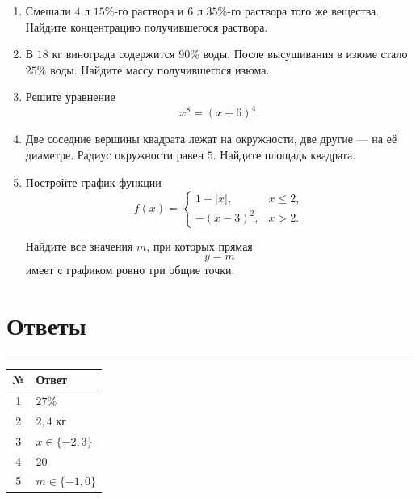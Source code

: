 \documentclass[a4paper,12pt]{article}
\newcommand{\sectionrule}{%
  \par
  \vspace{-0.35em}%
  {\color{accent}\rule{\linewidth}{0.6pt}}%
  \vspace{0.6em}%
}
\begin{document}
\begin{enumerate}

  \item
  Смешали \(4\) л \(15\%\)-го раствора и \(6\) л \(35\%\)-го
  раствора того же вещества.
  Найдите концентрацию получившегося раствора.

  \item
  В \(18\) кг винограда содержится \(90\%\) воды.
  После высушивания в изюме стало \(25\%\) воды.
  Найдите массу получившегося изюма.

  \item
  Решите уравнение
  \[
  x^8=(x+6)^4.
  \]

  \item
  Две соседние вершины квадрата лежат на окружности,
  две другие --- на её диаметре.
  Радиус окружности равен \(5\).
  Найдите площадь квадрата.

  \item
  Постройте график функции
  \[
  f(x)=
  \begin{cases}
  1-|x|, & x\le2,\\
  -(x-3)^2, & x>2.
  \end{cases}
  \]

  Найдите все значения \(m\), при которых прямая
  \[
  y=m
  \]
  имеет с графиком ровно три общие точки.

\end{enumerate}


\clearpage

\section*{Ответы}
\sectionrule

\begin{table}[h!]
\centering
\renewcommand{\arraystretch}{1.45}

\begin{tabularx}{0.82\linewidth}{c X}
\toprule
№ & Ответ \\
\midrule

1 & \(27\%\) \\

2 & \(2{,}4\) кг \\

3 & \(x\in\{-2,3\}\) \\

4 & \(20\) \\

5 & \(m\in\{-1,0\}\) \\

\bottomrule
\end{tabularx}
\end{table}
\end{document}

